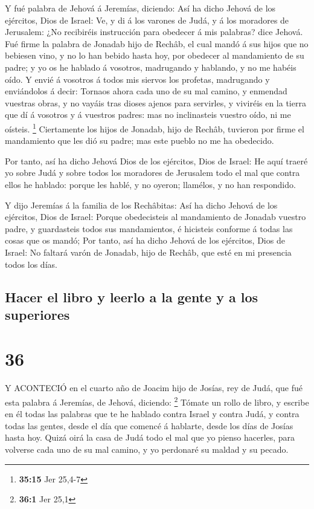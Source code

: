  Y fué palabra de Jehová á Jeremías, diciendo:
 Así ha dicho Jehová de los ejércitos, Dios de Israel: Ve,
y di á los varones de Judá, y á los moradores de Jerusalem: ¿No
recibiréis instrucción para obedecer á mis palabras? dice Jehová.
 Fué firme la palabra de Jonadab hijo de Rechâb, el cual
mandó á sus hijos que no bebiesen vino, y no lo han bebido hasta hoy,
por obedecer al mandamiento de su padre; y yo os he hablado á vosotros,
madrugando y hablando, y no me habéis oído.  Y envié á
vosotros á todos mis siervos los profetas, madrugando y enviándolos á
decir: Tornaos ahora cada uno de su mal camino, y enmendad vuestras
obras, y no vayáis tras dioses ajenos para servirles, y viviréis en la
tierra que dí á vosotros y á vuestros padres: mas no inclinasteis
vuestro oído, ni me oísteis. \footnote{\textbf{35:15} Jer 25,4-7}
 Ciertamente los hijos de Jonadab, hijo de Rechâb, tuvieron
por firme el mandamiento que les dió su padre; mas este pueblo no me ha
obedecido.

 Por tanto, así ha dicho Jehová Dios de los ejércitos, Dios
de Israel: He aquí traeré yo sobre Judá y sobre todos los moradores de
Jerusalem todo el mal que contra ellos he hablado: porque les hablé, y
no oyeron; llamélos, y no han respondido.

 Y dijo Jeremías á la familia de los Rechâbitas: Así ha
dicho Jehová de los ejércitos, Dios de Israel: Porque obedecisteis al
mandamiento de Jonadab vuestro padre, y guardasteis todos sus
mandamientos, é hicisteis conforme á todas las cosas que os mandó;
 Por tanto, así ha dicho Jehová de los ejércitos, Dios de
Israel: No faltará varón de Jonadab, hijo de Rechâb, que esté en mi
presencia todos los días.

\hypertarget{hacer-el-libro-y-leerlo-a-la-gente-y-a-los-superiores}{%
\subsection{Hacer el libro y leerlo a la gente y a los
superiores}\label{hacer-el-libro-y-leerlo-a-la-gente-y-a-los-superiores}}

\hypertarget{section-35}{%
\section{36}\label{section-35}}

 Y ACONTECIÓ en el cuarto año de Joacim hijo de Josías, rey
de Judá, que fué esta palabra á Jeremías, de Jehová, diciendo:
\footnote{\textbf{36:1} Jer 25,1}  Tómate un rollo de libro,
y escribe en él todas las palabras que te he hablado contra Israel y
contra Judá, y contra todas las gentes, desde el día que comencé á
hablarte, desde los días de Josías hasta hoy.  Quizá oirá la
casa de Judá todo el mal que yo pienso hacerles, para volverse cada uno
de su mal camino, y yo perdonaré su maldad y su pecado.

